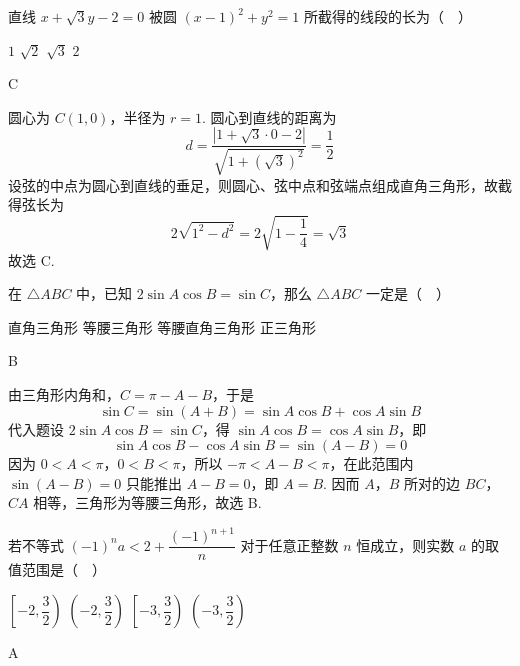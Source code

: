 \begin{problem}
直线 \(x+\sqrt{3}y-2=0\) 被圆 \((x-1)^2+y^2=1\) 所截得的线段的长为（\(\quad\)）

\choices
    {\(1\)}
    {\(\sqrt{2}\)}
    {\(\sqrt{3}\)}
    {\(2\)}
\end{problem}

\begin{answer}
C
\end{answer}

\begin{solution}
圆心为 \(C(1,0)\)，半径为 \(r=1\). 圆心到直线的距离为
\[
d=\frac{|1+\sqrt{3}\cdot0-2|}{\sqrt{1+(\sqrt{3})^2}}=\frac12
\]
设弦的中点为圆心到直线的垂足，则圆心、弦中点和弦端点组成直角三角形，故截得弦长为
\[
2\sqrt{1^2-d^2}=2\sqrt{1-\frac14}=\sqrt{3}
\]
故选 C.
\end{solution}

\begin{problem}
在 \(\triangle ABC\) 中，已知 \(2\sin A\cos B=\sin C\)，那么 \(\triangle ABC\) 一定是（\(\quad\)）

\choices
    {直角三角形}
    {等腰三角形}
    {等腰直角三角形}
    {正三角形}
\end{problem}

\begin{answer}
B
\end{answer}

\begin{solution}
由三角形内角和，\(C=\pi-A-B\)，于是
\[
\sin C=\sin(A+B)=\sin A\cos B+\cos A\sin B
\]
代入题设 \(2\sin A\cos B=\sin C\)，得 \(\sin A\cos B=\cos A\sin B\)，即
\[
\sin A\cos B-\cos A\sin B=\sin(A-B)=0
\]
因为 \(0<A<\pi\)，\(0<B<\pi\)，所以 \(-\pi<A-B<\pi\)，在此范围内 \(\sin(A-B)=0\) 只能推出 \(A-B=0\)，即 \(A=B\). 因而 \(A\)，\(B\) 所对的边 \(BC\)，\(CA\) 相等，三角形为等腰三角形，故选 B.
\end{solution}

\begin{problem}
若不等式 \((-1)^na<2+\dfrac{(-1)^{n+1}}{n}\) 对于任意正整数 \(n\) 恒成立，则实数 \(a\) 的取值范围是（\(\quad\)）

\choices
    {\(\left[-2,\dfrac{3}{2}\right)\)}
    {\(\left(-2,\dfrac{3}{2}\right)\)}
    {\(\left[-3,\dfrac{3}{2}\right)\)}
    {\(\left(-3,\dfrac{3}{2}\right)\)}
\end{problem}

\begin{answer}
A
\end{answer}

